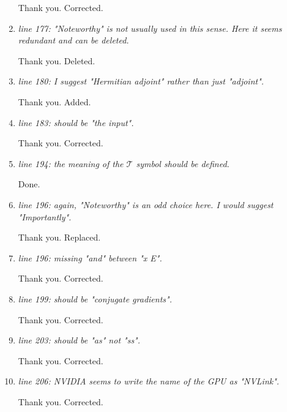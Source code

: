 \documentclass[a4paper,11pt,twoside]{report}
\begin{document}
\begin{enumerate}[resume]
    \hspace{1em} Thank you. Corrected.

    \item \textit{line 177: "Noteworthy" is not usually used in this sense. Here it seems redundant and can be deleted.}

    \hspace{1em} Thank you. Deleted.

    \item \textit{line 180: I suggest "Hermitian adjoint" rather than just "adjoint".}

    \hspace{1em} Thank you. Added.

    \item \textit{line 183: should be "the input".}

    \hspace{1em} Thank you. Corrected.

    \item \textit{line 194: the meaning of the $\mathcal{T}$ symbol should be defined.}

    \hspace{1em} Done.

    \item \textit{line 196: again, "Noteworthy" is an odd choice here. I would suggest "Importantly".}

    \hspace{1em} Thank you. Replaced.

    \item \textit{line 196: missing "and" between "x E".}

    \hspace{1em} Thank you. Corrected.

    \item \textit{line 199: should be "conjugate gradients".}

    \hspace{1em} Thank you. Corrected.

    \item \textit{line 203: should be "as" not "ss".}

    \hspace{1em} Thank you. Corrected.

    \item \textit{line 206: NVIDIA seems to write the name of the GPU as "NVLink".}

    \hspace{1em} Thank you. Corrected.


\end{enumerate}
\end{document}
